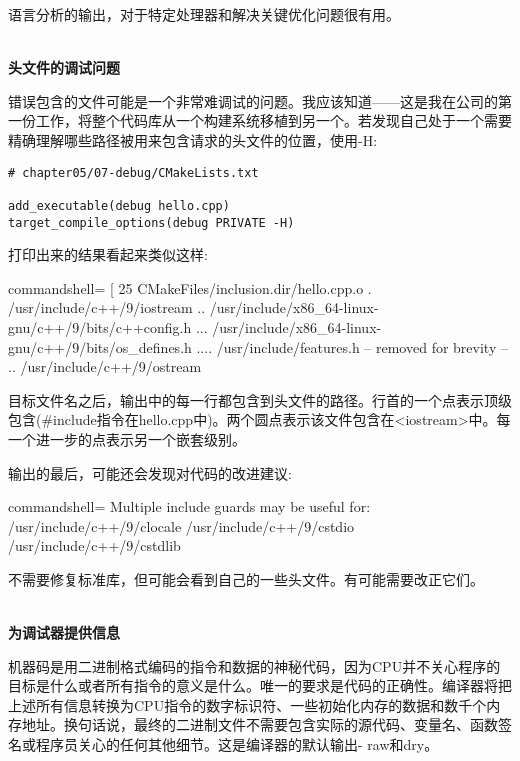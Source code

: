 语言分析的输出，对于特定处理器和解决关键优化问题很有用。

\hspace*{\fill} \\ %
\noindent
\textbf{头文件的调试问题}

错误包含的文件可能是一个非常难调试的问题。我应该知道——这是我在公司的第一份工作，将整个代码库从一个构建系统移植到另一个。若发现自己处于一个需要精确理解哪些路径被用来包含请求的头文件的位置，使用-H:

\begin{lstlisting}[style=styleCMake]
# chapter05/07-debug/CMakeLists.txt

add_executable(debug hello.cpp)
target_compile_options(debug PRIVATE -H)
\end{lstlisting}

打印出来的结果看起来类似这样:

\begin{tcblisting}{commandshell={}}
[ 25%
CMakeFiles/inclusion.dir/hello.cpp.o
. /usr/include/c++/9/iostream
.. /usr/include/x86_64-linux-gnu/c++/9/bits/c++config.h
... /usr/include/x86_64-linux-gnu/c++/9/bits/os_defines.h
.... /usr/include/features.h
-- removed for brevity --
.. /usr/include/c++/9/ostream
\end{tcblisting}

目标文件名之后，输出中的每一行都包含到头文件的路径。行首的一个点表示顶级包含(\#include指令在hello.cpp中)。两个圆点表示该文件包含在<iostream>中。每一个进一步的点表示另一个嵌套级别。

输出的最后，可能还会发现对代码的改进建议:

\begin{tcblisting}{commandshell={}}
Multiple include guards may be useful for:
/usr/include/c++/9/clocale
/usr/include/c++/9/cstdio
/usr/include/c++/9/cstdlib
\end{tcblisting}

不需要修复标准库，但可能会看到自己的一些头文件。有可能需要改正它们。

\hspace*{\fill} \\ %
\noindent
\textbf{为调试器提供信息}

机器码是用二进制格式编码的指令和数据的神秘代码，因为CPU并不关心程序的目标是什么或者所有指令的意义是什么。唯一的要求是代码的正确性。编译器将把上述所有信息转换为CPU指令的数字标识符、一些初始化内存的数据和数千个内存地址。换句话说，最终的二进制文件不需要包含实际的源代码、变量名、函数签名或程序员关心的任何其他细节。这是编译器的默认输出- raw和dry。

